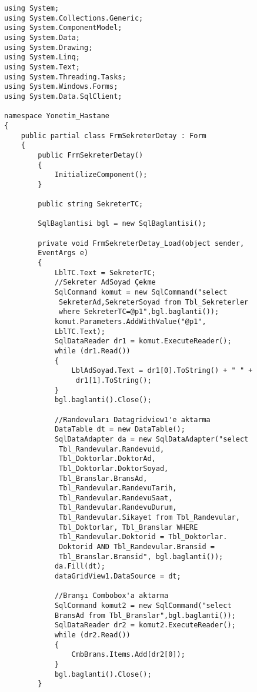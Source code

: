 \begin{lstlisting}
using System;
using System.Collections.Generic;
using System.ComponentModel;
using System.Data;
using System.Drawing;
using System.Linq;
using System.Text;
using System.Threading.Tasks;
using System.Windows.Forms;
using System.Data.SqlClient;

namespace Yonetim_Hastane
{
    public partial class FrmSekreterDetay : Form
    {
        public FrmSekreterDetay()
        {
            InitializeComponent();
        }

        public string SekreterTC;

        SqlBaglantisi bgl = new SqlBaglantisi();

        private void FrmSekreterDetay_Load(object sender, 
        EventArgs e)
        {
            LblTC.Text = SekreterTC;
            //Sekreter AdSoyad Çekme
            SqlCommand komut = new SqlCommand("select
             SekreterAd,SekreterSoyad from Tbl_Sekreterler 
             where SekreterTC=@p1",bgl.baglanti());
            komut.Parameters.AddWithValue("@p1", 
            LblTC.Text);
            SqlDataReader dr1 = komut.ExecuteReader();
            while (dr1.Read())
            {
                LblAdSoyad.Text = dr1[0].ToString() + " " +
                 dr1[1].ToString();
            }
            bgl.baglanti().Close();

            //Randevuları Datagridview1'e aktarma
            DataTable dt = new DataTable();
            SqlDataAdapter da = new SqlDataAdapter("select
             Tbl_Randevular.Randevuid, 
             Tbl_Doktorlar.DoktorAd, 
             Tbl_Doktorlar.DoktorSoyad, 
             Tbl_Branslar.BransAd, 
             Tbl_Randevular.RandevuTarih, 
             Tbl_Randevular.RandevuSaat, 
             Tbl_Randevular.RandevuDurum, 
             Tbl_Randevular.Sikayet from Tbl_Randevular, 
             Tbl_Doktorlar, Tbl_Branslar WHERE 
             Tbl_Randevular.Doktorid = Tbl_Doktorlar.
             Doktorid AND Tbl_Randevular.Bransid = 
             Tbl_Branslar.Bransid", bgl.baglanti());
            da.Fill(dt);
            dataGridView1.DataSource = dt;

            //Branşı Combobox'a aktarma
            SqlCommand komut2 = new SqlCommand("select 
            BransAd from Tbl_Branslar",bgl.baglanti());
            SqlDataReader dr2 = komut2.ExecuteReader();
            while (dr2.Read())
            {
                CmbBrans.Items.Add(dr2[0]);
            }
            bgl.baglanti().Close();
        }


\end{lstlisting}
